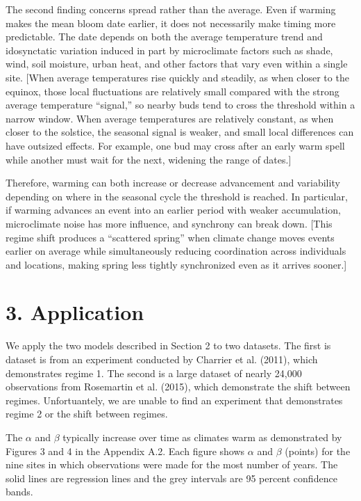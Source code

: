 The second finding concerns spread rather than the average. Even if
warming makes the mean bloom date earlier, it does not necessarily make
timing more predictable. The date depends on both the average
temperature trend and idosynctatic variation induced in part by
microclimate factors such as shade, wind, soil moisture, urban heat, and
other factors that vary even within a single site. [When average
temperatures rise quickly and steadily, as when closer to the equinox,
those local fluctuations are relatively small compared with the strong
average temperature ``signal,'' so nearby buds tend to cross the
threshold within a narrow window. When average temperatures are
relatively constant, as when closer to the solstice, the seasonal signal
is weaker, and small local differences can have outsized effects. For
example, one bud may cross after an early warm spell while another must
wait for the next, widening the range of dates.]

Therefore, warming can both increase or decrease advancement and
variability depending on where in the seasonal cycle the threshold is
reached. In particular, if warming advances an event into an earlier
period with weaker accumulation, microclimate noise has more influence,
and synchrony can break down. [This regime shift produces a ``scattered
spring'' when climate change moves events earlier on average while
simultaneously reducing coordination across individuals and locations,
making spring less tightly synchronized even as it arrives sooner.]



\section{3. Application}\label{application}

We apply the two models described in Section 2 to two datasets. The
first is dataset is from an experiment conducted by Charrier et al.
(2011), which demonstrates regime 1. The second is a large dataset of
nearly 24,000 observations from Rosemartin et al. (2015), which
demonstrate the shift between regimes. Unfortuantely, we are unable to
find an experiment that demonstrates regime 2 or the shift between
regimes.





The \(\alpha\) and \(\beta\) typically increase over time as climates
warm as demonstrated by Figures 3 and 4 in the Appendix A.2. Each figure
shows \(\alpha\) and \(\beta\) (points) for the nine sites in which
observations were made for the most number of years. The solid lines are
regression lines and the grey intervals are 95 percent confidence bands.


